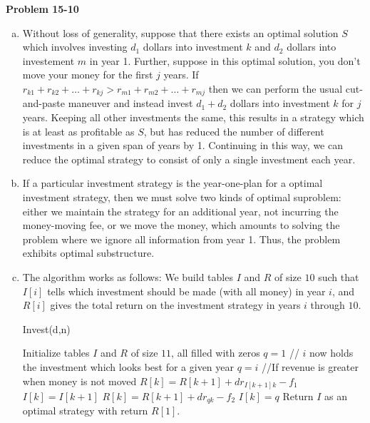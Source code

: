 \documentclass{article}
\begin{document}
\noindent\textbf{Problem 15-10}\\
\begin{enumerate}[a.]
\item Without loss of generality, suppose that there exists an optimal solution $S$ which involves investing $d_1$ dollars into investment $k$ and $d_2$ dollars into investement $m$ in year 1.  Further, suppose in this optimal solution, you don't move your money for the first $j$ years.   If $r_{k1} + r_{k2} + \ldots + r_{kj} > r_{m1} + r_{m2} + \ldots + r_{mj}$ then we can perform the usual cut-and-paste maneuver and instead invest $d_1 + d_2$ dollars into investment $k$ for $j$ years.  Keeping all other investments the same, this results in a strategy which is at least as profitable as $S$, but has reduced the number of different investments in a given span of years by 1.  Continuing in this way, we can reduce the optimal strategy to consist of only a single investment each year.  \\

\item If a particular investment strategy is the year-one-plan for a optimal investment strategy, then we must solve two kinds of optimal suproblem: either we maintain the strategy for an additional year, not incurring the money-moving fee, or we move the money, which amounts to solving the problem where we ignore all information from year 1. Thus, the problem exhibits optimal substructure. \\

\item  The algorithm works as follows: We build tables $I$ and $R$ of size $10$ such that $I[i]$ tells which investment should be made (with all money) in year $i$, and $R[i]$ gives the total return on the investment strategy in years $i$ through $10$.  \\
\begin{algorithm}
\caption{Invest(d,n)}
\begin{algorithmic}
\State Initialize tables $I$ and $R$ of size $11$, all filled with zeros
	\State $q = 1$
		 // $i$ now holds the investment which looks best for a given year
			\State $q = i$
		\EndIf
	\EndFor
	 //If revenue is greater when money is not moved
		\State $R[k] = R[k+1] + dr_{I[k+1]k} - f_1$
		\State $I[k] = I[k+1]$
	\Else
		\State $R[k] = R[k+1] + dr_{qk} - f_2$
		\State $I[k] = q$
	\EndIf
\EndFor
\State Return $I$ as an optimal strategy with return $R[1]$.
\end{algorithmic}
\end{algorithm}



\end{enumerate}
\end{document}
